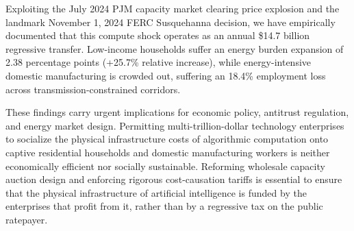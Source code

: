 \documentclass[11pt,a4paper]{article}
\begin{document}
Exploiting the July 2024 PJM capacity market clearing price explosion and the landmark November 1, 2024 FERC Susquehanna decision, we have empirically documented that this compute shock operates as an annual \$14.7 billion regressive transfer. Low-income households suffer an energy burden expansion of 2.38 percentage points (+25.7\% relative increase), while energy-intensive domestic manufacturing is crowded out, suffering an 18.4\% employment loss across transmission-constrained corridors.

These findings carry urgent implications for economic policy, antitrust regulation, and energy market design. Permitting multi-trillion-dollar technology enterprises to socialize the physical infrastructure costs of algorithmic computation onto captive residential households and domestic manufacturing workers is neither economically efficient nor socially sustainable. Reforming wholesale capacity auction design and enforcing rigorous cost-causation tariffs is essential to ensure that the physical infrastructure of artificial intelligence is funded by the enterprises that profit from it, rather than by a regressive tax on the public ratepayer.

\newpage



\end{document}
